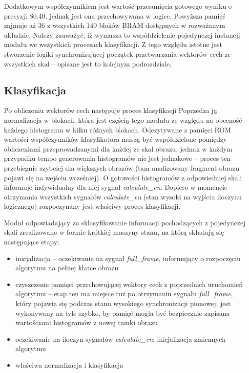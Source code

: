 Dodatkowym współczynnikiem jest wartość przesunięcia gotowego wyniku o precyzji S0.40, jednak jest ona przechowywana w logice. 
Powyższa pamięć zajmuje aż 36 z wszystkich 140 bloków BRAM dostępnych w rozważanym układzie. %
Należy zauważyć, iż wymusza to współdzielenie pojedynczej instancji modułu we wszystkich procesach klasyfikacji. 
Z tego względu istotne jest stworzenie logiki synchronizującej początek przetwarzania wektorów cech ze wszystkich skal -- opisane jest to kolejnym podrozdziale.

\subsection{Klasyfikacja}


Po obliczeniu wektorów cech następuje proces klasyfikacji %
Poprzedza ją normalizacja w blokach, która jest częścią tego modułu ze względu na obecność każdego histogramu w kilku różnych blokach. 
Odczytywane z pamięci ROM wartości współczynników klasyfikatora muszą być współdzielone pomiędzy obliczeniami przeprowadzanymi dla każdej ze skal obrazu, jednak w każdym przypadku tempo generowania histogramów nie jest jednakowe -- proces ten przebiegnie szybciej dla większych obrazów (tam analizowany fragment obrazu pojawi się na wejściu wcześniej). 
O gotowości histogramów z odpowiedniej skali informuje indywidualny dla niej sygnał \textit{calculate\_en}. 
Dopiero w momencie otrzymania wszystkich sygnałów \textit{calculate\_en} (stan wysoki na wyjściu iloczynu logicznego) rozpoczynany jest właściwy proces klasyfikacji.

Moduł odpowiadający za sklasyfikowanie informacji pochodzących z pojedynczej skali zrealizowano w formie krótkiej maszyny stanu, na którą składają się następujące etapy:
\begin{itemize}
	\item inicjalizacja -- oczekiwanie na sygnał \textit{full\_frame}, informujący o rozpoczęciu algorytmu na pełnej klatce obrazu
	\item czyszczenie pamięci przechowującej wektory cech z poprzednich uruchomień algorytmu -- etap ten ma miejsce tuż po otrzymaniu sygnału \textit{full\_frame}, który pojawia się podczas stanu wysokiego synchronizacji pionowej; jest wykonywany na tyle szybko, by pamięć mogła być bezpiecznie zapisana wartościami histogramów z nowej ramki obrazu %
	\item oczekiwanie na iloczyn sygnałów \textit{calculate\_en}; inicjalizacja zmiennych algorytmu
	\item właściwa normalizacja i klasyfikacja
\end{itemize}

